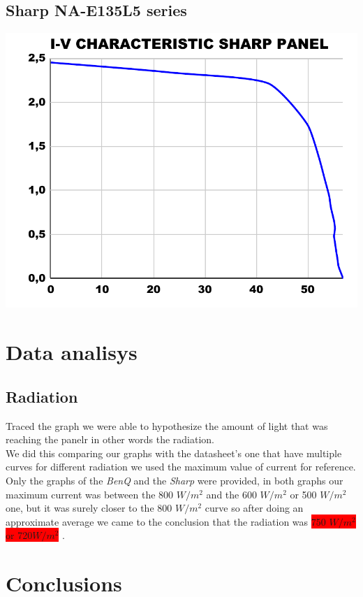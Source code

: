 \documentclass[12pt]{article}
\begin{document}
\subsection{Sharp NA-E135L5 series}
\includegraphics[scale=0.5]{sharp-iv.pdf}

\section{Data analisys}
\subsection{Radiation}
Traced the graph we were able to hypothesize the amount of light that was reaching the panelr in other words 
the radiation.\\
We did this comparing our graphs with the datasheet's one that have multiple curves for different radiation
we used the maximum value of current for reference.\\
Only the graphs of the \textit{BenQ} and the \textit{Sharp} were provided, in both graphs our maximum current
was between the 800 $W/m^2$ and the 600 $W/m^2$ or 500 $W/m^2$ one, but it was surely closer to the 800 $W/m^2$
curve so after doing an approximate average we came to the conclusion that the radiation was 
\colorbox{Red}{750 $W/m^2$ or 720$W/m^2$} 
.\\


\section{Conclusions}
\end{document}
